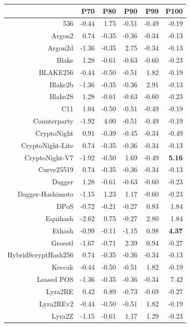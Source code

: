 \documentclass{bmcart}
\begin{document}
\begin{backmatter}
\begin{table}[ht]
	\centering
	\begin{tabular}{rrrrrr}
		\hline
		& P70 & P80 & P90 & P99 & P100 \\ 
		\hline
		536 & -0.44 & 1.75 & -0.51 & -0.49 & -0.19 \\ 
		Argon2 & 0.74 & -0.35 & -0.36 & -0.34 & -0.13 \\ 
		Argon2d & -1.36 & -0.35 & 2.75 & -0.34 & -0.13 \\ 
		Blake & 1.28 & -0.61 & -0.63 & -0.60 & -0.23 \\ 
		BLAKE256 & -0.44 & -0.50 & -0.51 & 1.82 & -0.19 \\ 
		Blake2b & -1.36 & -0.35 & -0.36 & 2.91 & -0.13 \\ 
		Blake2S & 1.28 & -0.61 & -0.63 & -0.60 & -0.23 \\ 
		C11 & 1.04 & -0.50 & -0.51 & -0.49 & -0.19 \\ 
		Counterparty & -1.92 & 4.00 & -0.51 & -0.49 & -0.19 \\ 
		CryptoNight & 0.91 & -0.39 & -0.45 & -0.34 & -0.49 \\ 
		CryptoNight-Lite & 0.74 & -0.35 & -0.36 & -0.34 & -0.13 \\ 
		CryptoNight-V7 & -1.92 & -0.50 & 1.69 & -0.49 & \textbf{5.16} \\ 
		Curve25519 & 0.74 & -0.35 & -0.36 & -0.34 & -0.13 \\ 
		Dagger & 1.28 & -0.61 & -0.63 & -0.60 & -0.23 \\ 
		Dagger-Hashimoto & -1.15 & 1.23 & 1.17 & -0.60 & -0.23 \\ 
		DPoS & -0.72 & -0.21 & -0.27 & 0.83 & 1.84 \\ 
		Equihash & -2.62 & 0.75 & -0.27 & 2.80 & 1.84 \\ 
		Ethash & -0.99 & -0.11 & -1.15 & 0.98 & \textbf{4.37} \\ 
		Groestl & -1.67 & -0.71 & 2.39 & 0.94 & -0.27 \\ 
		HybridScryptHash256 & 0.74 & -0.35 & -0.36 & -0.34 & -0.13 \\ 
		Keccak & -0.44 & -0.50 & -0.51 & 1.82 & -0.19 \\ 
		Leased POS & -1.36 & -0.35 & -0.36 & -0.34 & 7.42 \\ 
		Lyra2RE & 0.42 & 0.89 & -0.73 & -0.69 & -0.27 \\ 
		Lyra2REv2 & -0.44 & -0.50 & -0.51 & 1.82 & -0.19 \\ 
		Lyra2Z & -1.15 & -0.61 & 1.17 & 1.29 & -0.23 \\ 

\end{tabular}
\end{table}
\end{backmatter}
\end{document}
